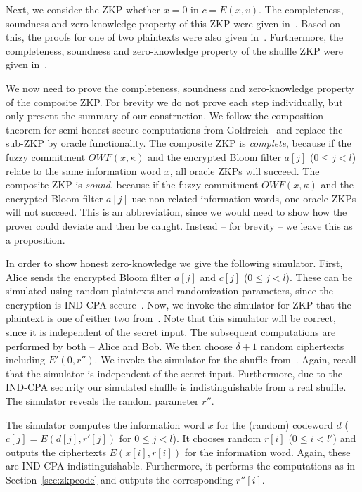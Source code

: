 \documentclass{llncs}
\begin{document}
Next, we consider the ZKP whether $x = 0$ in $c = E(x, v)$.
The completeness, soundness and zero-knowledge property of this ZKP were given in~\cite{DamJur01}.
Based on this, the proofs for one of two plaintexts were also given in~\cite{DamJur01}.
Furthermore, the completeness, soundness and zero-knowledge property of the shuffle ZKP were given in~\cite{Gro10}.

We now need to prove the completeness, soundness and zero-knowledge property of the composite ZKP.
For brevity we do not prove each step individually, but only present the summary of our construction.
We follow the composition theorem for semi-honest secure computations from Goldreich~\cite{Gol04} and replace the sub-ZKP by oracle functionality.
The composite ZKP is {\em complete}, because if the fuzzy commitment $OWF(x, \kappa)$ and the encrypted Bloom filter $a[j]$ ($0 \leq j < l$) relate to the same information word $x$, all oracle ZKPs will succeed.
The composite ZKP is {\em sound}, because if the fuzzy commitment $OWF(x, \kappa)$ and the encrypted Bloom filter $a[j]$ use non-related information words, one oracle ZKPs will not succeed.
This is an abbreviation, since we would need to show how the prover could deviate and then be caught.
Instead -- for brevity -- we leave this as a proposition.

In order to show honest zero-knowledge we give the following simulator.
First, Alice sends the encrypted Bloom filter $a[j]$ and $c[j]$ ($0 \leq j < l$).
These can be simulated using random plaintexts and randomization parameters, since the encryption is IND-CPA secure~\cite{BonGoh05}.
Now, we invoke the simulator for ZKP that the plaintext is one of either two from~\cite{DamJur01}.
Note that this simulator will be correct, since it is independent of the secret input.
The subsequent computations are performed by both -- Alice and Bob.
We then choose $\delta + 1$ random ciphertexts including $E'(0, r'')$.
We invoke the simulator for the shuffle from~\cite{Gro10}.
Again, recall that the simulator is independent of the secret input.
Furthermore, due to the IND-CPA security our simulated shuffle is indistinguishable from a real shuffle.
The simulator reveals the random parameter $r''$.



The simulator computes the information word $x$ for the (random) codeword $d$ ($c[j] = E(d[j], r'[j])$ for $0 \leq j < l$).
It chooses random $r[i]$ ($0 \leq i < l'$) and outputs the ciphertexts $E(x[i], r[i])$ for the information word.
Again, these are IND-CPA indistinguishable.
Furthermore, it performs the computations as in Section~\ref{sec:zkpcode} and outputs the corresponding $r''[i]$.
\end{document}
